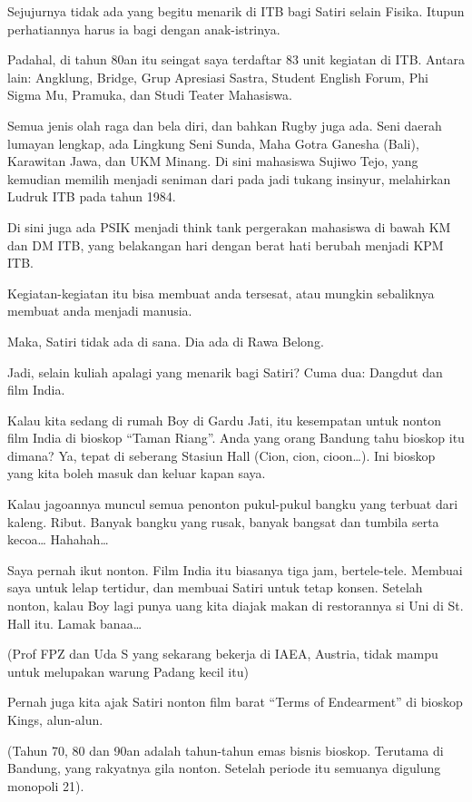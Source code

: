 Sejujurnya tidak ada yang begitu menarik di ITB bagi Satiri selain Fisika. Itupun perhatiannya harus ia bagi dengan anak-istrinya.

Padahal, di tahun 80an itu seingat saya terdaftar 83 unit kegiatan di ITB. Antara lain: Angklung, Bridge, Grup Apresiasi Sastra, Student English Forum, Phi Sigma Mu, Pramuka, dan Studi Teater Mahasiswa.

Semua jenis olah raga dan bela diri, dan bahkan Rugby juga ada. Seni daerah lumayan lengkap, ada Lingkung Seni Sunda, Maha Gotra Ganesha (Bali), Karawitan Jawa, dan UKM Minang. Di sini mahasiswa Sujiwo Tejo, yang kemudian memilih menjadi seniman dari pada jadi tukang insinyur, melahirkan Ludruk ITB pada tahun 1984.

Di sini juga ada PSIK menjadi think tank pergerakan mahasiswa di bawah KM dan DM ITB, yang belakangan hari dengan berat hati berubah menjadi KPM ITB.

Kegiatan-kegiatan itu bisa membuat anda tersesat, atau mungkin sebaliknya membuat anda menjadi manusia.

Maka, Satiri tidak ada di sana. Dia ada di Rawa Belong.

Jadi, selain kuliah apalagi yang menarik bagi Satiri? Cuma dua: Dangdut dan film India.

Kalau kita sedang di rumah Boy di Gardu Jati, itu kesempatan untuk nonton film India di bioskop “Taman Riang”. Anda yang orang Bandung tahu bioskop itu dimana? Ya, tepat di seberang Stasiun Hall (Cion, cion, cioon…). Ini bioskop yang kita boleh masuk dan keluar kapan saya.

Kalau jagoannya muncul semua penonton pukul-pukul bangku yang terbuat dari kaleng. Ribut. Banyak bangku yang rusak, banyak bangsat dan tumbila serta kecoa… Hahahah…

Saya pernah ikut nonton. Film India itu biasanya tiga jam, bertele-tele. Membuai saya untuk lelap tertidur, dan membuai Satiri untuk tetap konsen. Setelah nonton, kalau Boy lagi punya uang kita diajak makan di restorannya si Uni di St. Hall itu. Lamak banaa…

(Prof FPZ dan Uda S yang sekarang bekerja di IAEA, Austria, tidak mampu untuk melupakan warung Padang kecil itu)

Pernah juga kita ajak Satiri nonton film barat “Terms of Endearment” di bioskop Kings, alun-alun.

(Tahun 70, 80 dan 90an adalah tahun-tahun emas bisnis bioskop. Terutama di Bandung, yang rakyatnya gila nonton. Setelah periode itu semuanya digulung monopoli 21).

